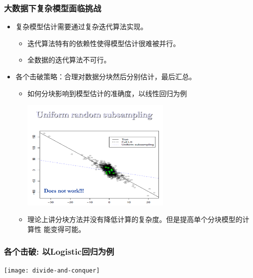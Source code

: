 \documentclass[10pt]{beamer}
\begin{document}
\begin{frame}
  \frametitle{大数据下复杂模型面临挑战}

    \begin{itemize}

    \item 复杂模型估计需要通过复杂迭代算法实现。

      \begin{itemize}
      \item 迭代算法特有的依赖性使得模型估计很难被并行。
      \item 全数据的迭代算法不可行。
      \end{itemize}

    \item 各个击破策略：合理对数据分块然后分别估计，最后汇总。

      \begin{itemize}
      \item 如何分块影响到模型估计的准确度，以线性回归为例 \citet{ma2013statistical}


      \includegraphics[trim=2cm 0.3cm 0cm 4cm,clip,width=0.6\textwidth]{leverage}


    \item 理论上讲分块方法并没有降低计算的复杂度。但是提高单个分块模型的计算性
      能变得可能。

      \end{itemize}

    \end{itemize}


\end{frame}


\begin{frame}
  \frametitle{各个击破: 以Logistic回归为例}
  \texttt{[image: divide-and-conquer]}
\end{frame}
\end{document}
